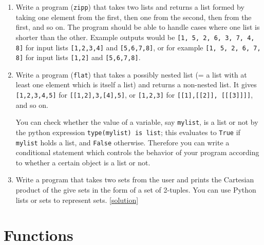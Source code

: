 \documentclass[a4paper]{article}
\begin{document}
\begin{itemize}
\begin{uexercise}
\begin{enumerate}
\item
Write a program (\Verb+zipp+) that takes two lists and returns a list formed by
taking one element from the first, then one from the second, then from the
first, and so on. The program should be able to handle cases where one list is
shorter than the other. Example outputs would be  
\Verb+[1, 5, 2, 6, 3, 7, 4, 8]+
for input lists \Verb+[1,2,3,4]+ and \Verb+[5,6,7,8]+, or for example 
\Verb+[1, 5, 2, 6, 7, 8]+ for input lists \Verb+[1,2]+ and \Verb+[5,6,7,8]+.



\item
Write a program (\Verb+flat+) that takes a possibly nested list (= a list
with at least one element which is itself a list) and returns a non-nested list.
It gives \Verb+[1,2,3,4,5]+ for \Verb+[[1,2],3,[4],5]+, or \Verb+[1,2,3]+ for
\Verb+[[1],[[2]], [[[3]]]]+, and so on.   

You can check whether the value of a variable, say \Verb+mylist+, is a list or
not by the python expression \Verb+type(mylist) is list+; this evaluates to
\Verb+True+ if \Verb+mylist+ holds a list, and \Verb+False+ otherwise. Therefore
you can write a conditional statement which controls the behavior of your
program according to whether a certain object is a list or not.



\item \label{excartesian}
Write a program that takes two sets from the user and prints the Cartesian
product of the give sets in the form of a set of 2-tuples. You can use Python lists or
sets to represent sets.
\href{https://github.com/umutozge/prog-book/blob/master/code/cartesian-product.py}{[solution]}

\end{enumerate}
\end{uexercise}

\end{itemize}


\section{Functions}
\label{sec:functions}
\end{document}
